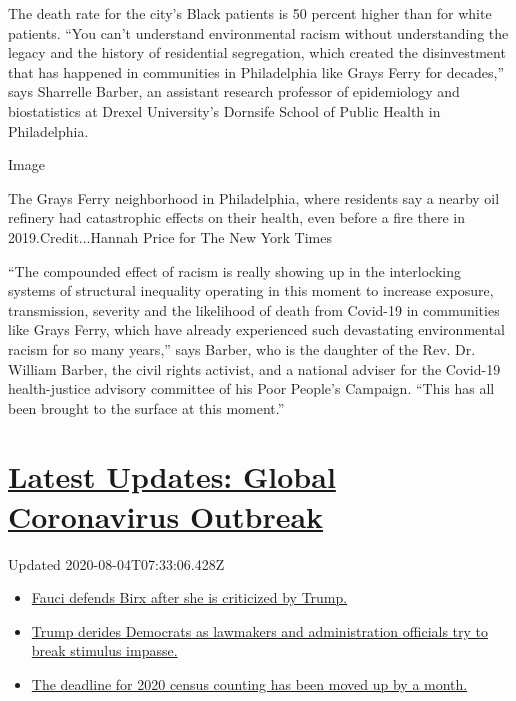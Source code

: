 The death rate for the city's Black patients is 50 percent higher than
for white patients. ``You can't understand environmental racism without
understanding the legacy and the history of residential segregation,
which created the disinvestment that has happened in communities in
Philadelphia like Grays Ferry for decades,'' says Sharrelle Barber, an
assistant research professor of epidemiology and biostatistics at Drexel
University's Dornsife School of Public Health in Philadelphia.

Image

The Grays Ferry neighborhood in Philadelphia, where residents say a
nearby oil refinery had catastrophic effects on their health, even
before a fire there in 2019.Credit...Hannah Price for The New York Times

``The compounded effect of racism is really showing up in the
interlocking systems of structural inequality operating in this moment
to increase exposure, transmission, severity and the likelihood of death
from Covid-19 in communities like Grays Ferry, which have already
experienced such devastating environmental racism for so many years,''
says Barber, who is the daughter of the Rev. Dr. William Barber, the
civil rights activist, and a national adviser for the Covid-19
health-justice advisory committee of his Poor People's Campaign. ``This
has all been brought to the surface at this moment.''

\hypertarget{latest-updates-global-coronavirus-outbreak}{%
\section{\texorpdfstring{\href{https://www.nytimes.com/2020/08/03/world/coronavirus-covid-19.html?action=click\&pgtype=Article\&state=default\&region=MAIN_CONTENT_1\&context=storylines_live_updates}{Latest
Updates: Global Coronavirus
Outbreak}}{Latest Updates: Global Coronavirus Outbreak}}\label{latest-updates-global-coronavirus-outbreak}}

Updated 2020-08-04T07:33:06.428Z

\begin{itemize}
\tightlist
\item
  \href{https://www.nytimes.com/2020/08/03/world/coronavirus-covid-19.html?action=click\&pgtype=Article\&state=default\&region=MAIN_CONTENT_1\&context=storylines_live_updates\#link-4547638f}{Fauci
  defends Birx after she is criticized by Trump.}
\item
  \href{https://www.nytimes.com/2020/08/03/world/coronavirus-covid-19.html?action=click\&pgtype=Article\&state=default\&region=MAIN_CONTENT_1\&context=storylines_live_updates\#link-15e7f995}{Trump
  derides Democrats as lawmakers and administration officials try to
  break stimulus impasse.}
\item
  \href{https://www.nytimes.com/2020/08/03/world/coronavirus-covid-19.html?action=click\&pgtype=Article\&state=default\&region=MAIN_CONTENT_1\&context=storylines_live_updates\#link-e5a2cda}{The
  deadline for 2020 census counting has been moved up by a month.}
\end{itemize}

